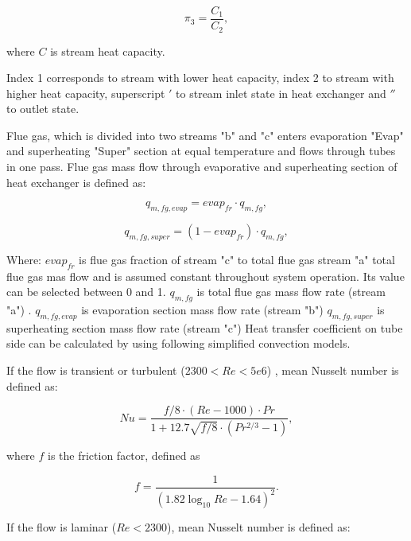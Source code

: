 \documentclass{article}
\begin{document}
	\begin{equation}\label{eq:pi_params3}
		\pi_3 = \frac{C_1}{C_2},
	\end{equation}
	
	\noindent
	where $C$ is stream heat capacity.
	
	Index 1 corresponds to stream with lower heat capacity, index 2 to stream with higher heat capacity, superscript $'$ to stream inlet state in heat exchanger and $''$ to outlet state.
	
	Flue gas, which is divided into two streams "b" and "c" enters evaporation "Evap" and superheating "Super" section at equal temperature and flows through tubes in one pass. Flue gas mass flow through evaporative and superheating section of heat exchanger is defined as:
	
	\begin{equation}\label{eq:flue_gas_flow1}
		q_{m,fg,evap} = evap_{fr} \cdot q_{m,fg},
	\end{equation}
	
	\begin{equation}\label{eq:flue_gas_flow2}
		q_{m,fg,super} = (1-evap_{fr}) \cdot q_{m,fg},
	\end{equation}
	
	\noindent
	Where:
	$evap_{fr}$ is flue gas fraction of stream "c" to total flue gas stream "a"  total flue gas mas flow and is assumed constant throughout system operation. Its value can be selected between 0 and 1.
	$q_{m,fg}$ is total flue gas mass flow rate (stream "a") .
	$q_{m,fg,evap}$ is evaporation section mass flow rate (stream "b")
	$q_{m,fg,super}$ is superheating section mass flow rate (stream "c")
	Heat transfer coefficient on tube side can be calculated by using following simplified convection models.
	
	\noindent
	If the flow is transient or turbulent ($2300 < Re < 5e6$) , mean Nusselt number is defined as:
	
	\begin{equation}\label{eq:nusselt}
		Nu = \frac{f/8 \cdot (Re - 1000) \cdot Pr}{1+12.7\sqrt{f/8} \cdot (Pr^{2/3}-1)},
	\end{equation}
	
	\noindent
	where $f$ is the friction factor, defined as
	
	\begin{equation}\label{eq:fric_factor}
		f = \frac{1}{(1.82\log_{10}Re - 1.64)^2}.
	\end{equation}
	
	\noindent
	If the flow is laminar ($Re<2300$), mean Nusselt number is defined as:
	
\end{document}

